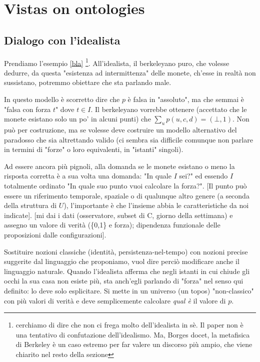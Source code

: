 \section{Vistas on ontologies}

\subsection{Dialogo con l'idealista} Prendiamo l'esempio \ref{bla} \footnote{cerchiamo di dire che non ci frega molto dell'idealista in sè. Il paper non è una tentativo di confutazione dell'idealismo. Ma, Borges docet, la metafisica di Berkeley è un caso estremo per far valere un discorso più ampio, che viene chiarito nel resto della sezione}. All'idealista, il berkeleyano puro, che volesse dedurre, da questa "esistenza ad intermittenza" delle monete, ch'esse in realtà non sussistano, potremmo obiettare che sta parlando male. 

In questo modello è scorretto dire che $p$ è falsa in "assoluto", ma che semmai è "falsa con forza $t$" dove $t \in I$. Il berkeleyano vorrebbe ottenere (accettato che le monete esistano solo un po' in alcuni punti) che $\sum_u p(u,c,d) = (\bot,1)$. Non può per costruzione, ma se volesse deve costruire un modello alternativo del paradosso che sia altrettando valido (ci sembra sia difficile comunque non parlare in termini di "forze" o loro equivalenti, in "istanti" singoli).  

Ad essere ancora più pignoli, alla domanda se le monete esistano o meno la risposta corretta è a sua volta una domanda: "In quale $I$ sei?" ed essendo $I$ totalmente ordinato "In quale suo punto vuoi calcolare la forza?". [Il punto può essere un riferimento temporale, spaziale o di qualunque altro genere (a seconda della struttura di $U$), l'importante è che l'insieme abbia le caratteristiche da noi indicate]. [mi dai i dati (osservatore, subset di C, giorno della settimana) e assegno un valore di verità (\{0,1\} e forza); dipendenza funzionale delle proposizioni dalle configurazioni]. 

Sostituire nozioni classiche (identità, persistenza-nel-tempo) con nozioni precise suggerite dal linguaggio che proponiamo, vuol dire perciò modificare anche il linguaggio naturale. Quando l'idealista afferma che negli istanti in cui chiude gli occhi la sua casa non esiste più, sta anch'egli parlando di "forza" nel senso qui definito: lo deve solo esplicitare. Si mette in un universo (un topos) "non-classico" con più valori di verità e deve semplicemente calcolare \emph{qual è} il valore di $p$. 

